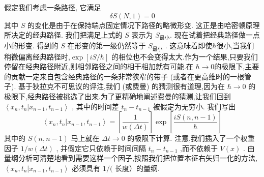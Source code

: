 假定我们考虑一条路径, 它满足
\begin{equation}
{\delta S}\left( {N,1}\right) = 0
\end{equation}
其中 $S$ 的变化是由于在保持端点固定情况下路径的略微形变. 这正是由哈密顿原理所决定的经典路径. 我们把满足上式的 $S$ 表示为 ${S}_{\text{最小}}$. 现在试着把经典路径做一点小的形变. 得到的 $S$ 在形变的第一级仍然等于 ${S}_{\text{最小}}$ . 这意味着即使$\hbar$很小,当我们稍微偏离经典路径时,$\exp\left\lbrack{{iS}/\hbar}\right\rbrack$ 的相位也不会变得太大.作为一个结果,只要我们停留在经典路径附近,则相邻路径之间的相干相加就有可能.在 $\hbar \rightarrow 0$的极限下,主要的贡献一定来自包含经典路径的一条非常狭窄的带子 (或者在更高维时的一根管子). 基于狄拉克不可思议的评注,我们 (或费曼) 的猜测很有道理,因为在 $\hbar \rightarrow 0$ 的极限下,经典路径被挑选了出来.为了更精确地阐述费曼的猜测,让我们回到 $\left\langle {{x}_{n},{t}_{n} | {x}_{n - 1},{t}_{n - 1}}\right\rangle$ , 其中的时间差 ${t}_{n} - {t}_{n - 1}$ 被假定为无穷小. 我们写出
\begin{equation}
\left\langle {{x}_{n},{t}_{n} | {x}_{n - 1},{t}_{n - 1}}\right\rangle = \left\lbrack \frac{1}{w\left( {\Delta t}\right) }\right\rbrack \exp \left\lbrack \frac{{iS}\left( {n, n - 1}\right) }{\hbar }\right\rbrack
\end{equation}
其中的 $S\left( {n, n - 1}\right)$ 马上就在 ${\Delta t} \rightarrow 0$ 的极限下计算. 注意,我们插入了一个权重因子 $1/w\left( {\Delta t}\right)$ , 并假定它只依赖于时间间隔 ${t}_{n} - {t}_{n - 1}$ ,而不依赖于 $V\left( x\right)$ . 由量纲分析可清楚地看到需要这样一个因子,按照我们把位置本征右矢归一化的方法, $\left\langle {{x}_{n},{t}_{n} | {x}_{n - 1},{t}_{n - 1}}\right\rangle$ 必须具有 $1/($ 长度）的量纲.

